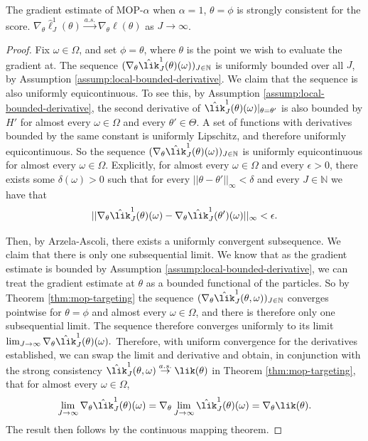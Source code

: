 \documentclass[9pt,twoside,lineno]{pnas-new}
\begin{document}
\begin{thm}
    The gradient estimate of MOP-$\alpha$ when $\alpha=1$, $\theta=\phi$ is strongly consistent for the score. $\nabla_\theta \hat\ell_J^1(\theta) \stackrel{a.s.}{\to} \nabla_\theta \ell(\theta)$ as $J \to \infty$.
    \label{thm:mop-grad-consistency}
\end{thm}
\begin{proof}
    Fix $\omega \in \Omega$, and set $\phi = \theta$, where $\theta$ is the point we wish to evaluate the gradient at. The sequence $(\nabla_\theta \hat\lik_J^1(\theta)(\omega))_{J \in \mathbb{N}}$ is uniformly bounded over all $J$, by Assumption \ref{assump:local-bounded-derivative}. We claim that the sequence is also uniformly equicontinuous. To see this, by Assumption \ref{assump:local-bounded-derivative}, the second derivative of $\hat\lik_J^1(\theta)(\omega)|_{\theta=\theta'}$ is also bounded by $H'$ for almost every $\omega\in \Omega$ and every $\theta'\in \Theta$. A set of functions with derivatives bounded by the same constant is uniformly Lipschitz, and therefore uniformly equicontinuous. So the sequence $(\nabla_\theta \hat\lik_J^1(\theta)( \omega))_{J \in \mathbb{N}}$ is uniformly equicontinuous for almost every $\omega \in \Omega$. 
    Explicitly, for almost every $\omega \in \Omega$ and every $\epsilon>0$, there exists some $\delta(\omega)>0$ such that for every $||\theta - \theta'||_{\infty}<\delta$ and every $J \in \mathbb{N}$ we have that
    $$||\nabla_\theta \hat\lik_J^1(\theta)(\omega)-\nabla_\theta \hat\lik_J^1(\theta')(\omega)||_\infty < \epsilon.$$

    Then, by Arzela-Ascoli, there exists a uniformly convergent subsequence. We claim that there is only one subsequential limit. We know that as the gradient estimate is bounded by Assumption \ref{assump:local-bounded-derivative}, we can treat the gradient estimate at $\theta$ as a bounded functional of the particles. So by Theorem \ref{thm:mop-targeting} the sequence $(\nabla_\theta \hat\lik_J^1(\theta, \omega))_{J \in \mathbb{N}}$ converges pointwise for $\theta=\phi$ and almost every $\omega \in \Omega$, and there is therefore only one subsequential limit. The sequence therefore converges uniformly to its limit $\lim_{J \to \infty} \nabla_\theta \hat\lik_J^1(\theta)(\omega).$ Therefore, with uniform convergence for the derivatives established, we can swap the limit and derivative and obtain, in conjunction with the strong consistency $\hat{\lik}_J^1(\theta, \omega) \stackrel{a.s.}{\to} \lik(\theta)$ in Theorem \ref{thm:mop-targeting}, that for almost every $\omega \in \Omega$, 
    $$\lim_{J \to \infty} \nabla_\theta \hat\lik_J^1(\theta)(\omega) = \nabla_\theta \lim_{J \to \infty} \hat\lik_J^1(\theta)(\omega) = \nabla_\theta \lik(\theta).$$
    The result then follows by the continuous mapping theorem. 
\end{proof}
\end{document}
